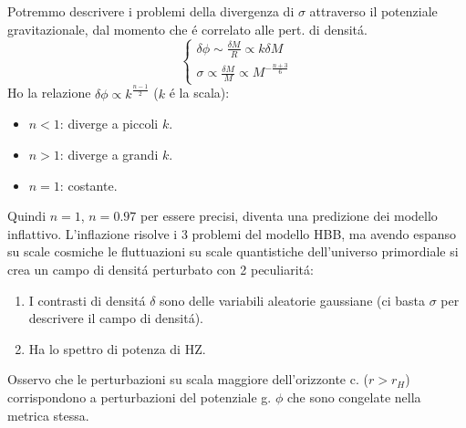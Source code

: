 \documentclass[12pt, a4paper]{article}
\begin{document}
Potremmo descrivere i problemi della divergenza di $\sigma$ attraverso il potenziale gravitazionale, dal momento che \'{e} correlato alle pert. di densit\'{a}.
\begin{equation}
\begin{cases}
\delta \phi \sim \frac{\delta M}{R}\propto k \delta M
\\
\sigma\propto \frac{\delta M}{M} \propto M^{-\frac{n+3}{6}}
\end{cases}
\end{equation}
Ho la relazione $\delta \phi \propto k^{\frac{n-1}{2}}$ ($k$ \'{e} la scala):
\begin{itemize}
\item $n<1$: diverge a piccoli $k$.
\item $n>1$: diverge a grandi $k$.
\item $n=1$: costante.
\end{itemize}
Quindi $n=1$, $n=0.97$ per essere precisi, diventa una predizione dei modello inflattivo. L'inflazione risolve i 3 problemi del modello HBB, ma avendo espanso su scale cosmiche le fluttuazioni su scale quantistiche dell'universo primordiale si crea un campo di densit\'{a} perturbato con 2 peculiarit\'{a}:
\begin{enumerate}
\item I contrasti di densit\'{a} $\delta$ sono delle variabili aleatorie gaussiane (ci basta $\sigma$ per descrivere il campo di densit\'{a}).
\item Ha lo spettro di potenza di HZ.
\end{enumerate}
Osservo che le perturbazioni su scala maggiore dell'orizzonte c. ($r>r_H$) corrispondono a perturbazioni del potenziale g. $\phi$ che sono congelate nella metrica stessa.
\end{document}
